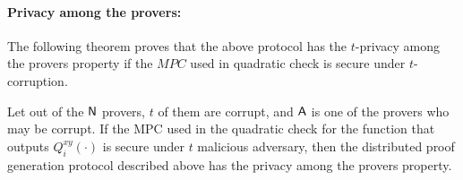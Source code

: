 \paragraph{Privacy among the provers: } The following theorem proves that the above protocol has the $t$-privacy among the provers property if the $MPC$ used in quadratic check is secure under $t$-corruption.

\begin{theorem}
	Let out of the $\mathsf{N}$ provers, $t$ of them are corrupt, and $\mathsf{A}$ is one of the provers who may be corrupt. If the MPC used in the quadratic check for the function that outputs $Q^{xy}_i(\cdot)$ is secure under $t$ malicious adversary, then the distributed proof generation protocol described above has the privacy among the provers property. 
\end{theorem} 

